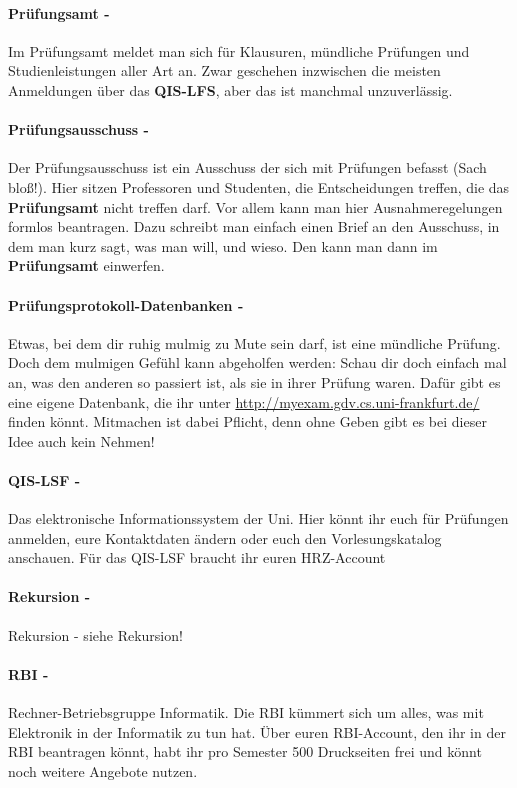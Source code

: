 \paragraph{Prüfungsamt -} Im Prüfungsamt meldet man sich für Klausuren, mündliche Prüfungen und Studienleistungen aller Art an. Zwar geschehen inzwischen die meisten Anmeldungen über das \textbf{QIS-LFS}, aber das ist manchmal unzuverlässig.
\paragraph{Prüfungsausschuss -} Der Prüfungsausschuss ist ein Ausschuss der sich mit Prüfungen befasst (Sach bloß!). Hier sitzen Professoren und Studenten, die Entscheidungen treffen, die das \textbf{Prüfungsamt} nicht treffen darf.  Vor allem kann man hier Ausnahmeregelungen formlos beantragen. Dazu schreibt man einfach einen Brief an den Ausschuss, in dem man kurz sagt, was man will, und wieso. Den kann man dann im \textbf{Prüfungsamt} einwerfen.
\paragraph{Prüfungsprotokoll-Datenbanken -} Etwas, bei dem dir ruhig mulmig zu Mute sein darf, ist eine mündliche Prüfung. Doch dem mulmigen Gefühl kann abgeholfen werden: Schau dir doch einfach mal an, was den anderen so passiert ist, als sie in ihrer Prüfung waren. Dafür gibt es eine eigene Datenbank, die ihr unter \url{http://myexam.gdv.cs.uni-frankfurt.de/} finden könnt. Mitmachen ist dabei Pflicht, denn ohne Geben gibt es bei dieser Idee auch kein Nehmen!
\paragraph{QIS-LSF -} Das elektronische Informationssystem der Uni. Hier könnt ihr euch für Prüfungen anmelden, eure Kontaktdaten ändern oder euch den Vorlesungskatalog anschauen. Für das QIS-LSF braucht ihr euren HRZ-Account
\paragraph{Rekursion -} Rekursion - siehe Rekursion!
\paragraph{RBI -} \glqq Rechner-Betriebsgruppe Informatik\grqq . Die RBI kümmert sich um alles, was mit Elektronik in der Informatik zu tun hat. Über euren RBI-Account, den ihr in der RBI beantragen könnt, habt ihr pro Semester 500 Druckseiten frei und könnt noch weitere Angebote nutzen.
